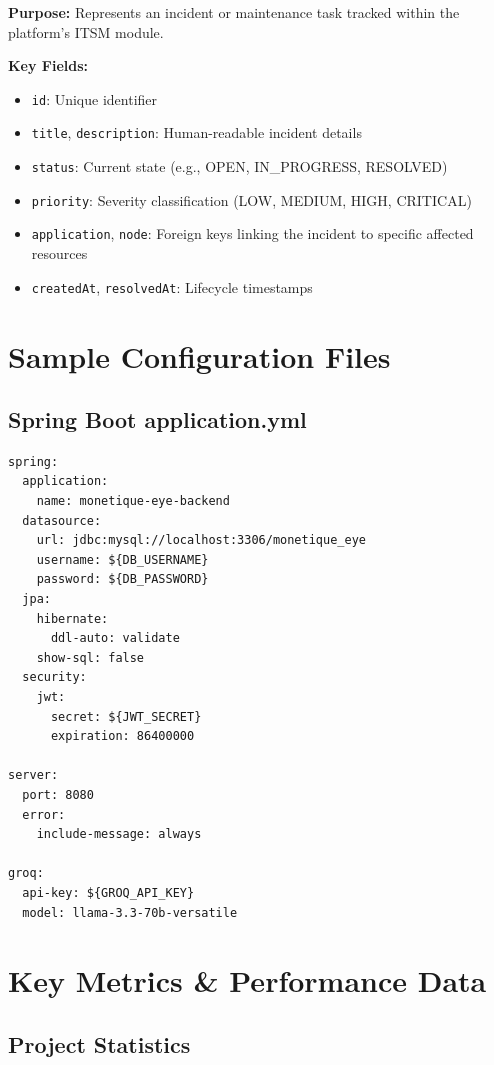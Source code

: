 \documentclass[12pt,a4paper]{report}
\begin{document}
\begin{tcolorbox}
  \textbf{Purpose:} Represents an incident or maintenance task tracked within the platform's ITSM module.
  
  \textbf{Key Fields:}
  \begin{itemize}
    \item \texttt{id}: Unique identifier
    \item \texttt{title}, \texttt{description}: Human-readable incident details
    \item \texttt{status}: Current state (e.g., OPEN, IN\_PROGRESS, RESOLVED)
    \item \texttt{priority}: Severity classification (LOW, MEDIUM, HIGH, CRITICAL)
    \item \texttt{application}, \texttt{node}: Foreign keys linking the incident to specific affected resources
    \item \texttt{createdAt}, \texttt{resolvedAt}: Lifecycle timestamps
  \end{itemize}
\end{tcolorbox}

\section{Sample Configuration Files}\label{app:config_files}

\subsection{Spring Boot application.yml}

\begin{verbatim}
spring:
  application:
    name: monetique-eye-backend
  datasource:
    url: jdbc:mysql://localhost:3306/monetique_eye
    username: ${DB_USERNAME}
    password: ${DB_PASSWORD}
  jpa:
    hibernate:
      ddl-auto: validate
    show-sql: false
  security:
    jwt:
      secret: ${JWT_SECRET}
      expiration: 86400000

server:
  port: 8080
  error:
    include-message: always

groq:
  api-key: ${GROQ_API_KEY}
  model: llama-3.3-70b-versatile
\end{verbatim}


\section{Key Metrics \& Performance Data}\label{app:metrics_data}

\subsection{Project Statistics}
\end{document}
